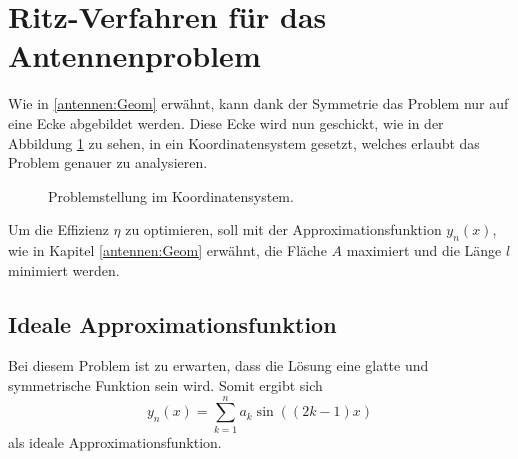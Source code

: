 %
%
% 
%
%

\usetikzlibrary{pgfplots.fillbetween}

\section{Ritz-Verfahren für das Antennenproblem\label{antennen:ritzAnw}}
Wie in \ref{antennen:Geom} erwähnt, kann dank der Symmetrie das Problem nur auf eine Ecke abgebildet werden. 
Diese Ecke wird nun geschickt, wie in der Abbildung \ref{antennen:koordSysBsp} zu sehen, 
in ein Koordinatensystem gesetzt, welches erlaubt das Problem genauer zu analysieren.
\begin{figure}
	\centering
	\caption{Problemstellung im Koordinatensystem.}
	\label{antennen:koordSysBsp}
\end{figure}

Um die Effizienz $\eta$ zu optimieren, soll mit der Approximationsfunktion
$y_n(x)$, wie in Kapitel \ref{antennen:Geom} erwähnt, die Fläche $A$ 
maximiert und die Länge $l$ minimiert werden.

\subsection{Ideale Approximationsfunktion\label{antennen:unsereApproxFunkt}}

Bei diesem Problem ist zu erwarten, dass die Lösung eine glatte und symmetrische
Funktion sein wird. Somit ergibt sich
\begin{equation}
	y_n(x)
	= 
	\sum_{k=1}^n a_k\sin((2k-1)x)
	\label{antennen:unserRitz}
\end{equation}
als ideale Approximationsfunktion. 
%

